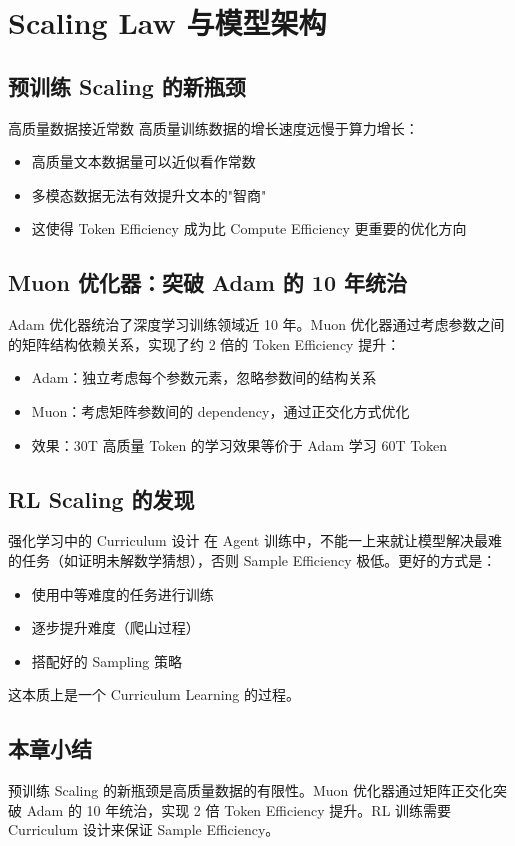 \section{Scaling Law 与模型架构}

\subsection{预训练 Scaling 的新瓶颈}

\begin{warningbox}{高质量数据接近常数}
高质量训练数据的增长速度远慢于算力增长：
\begin{itemize}
    \item 高质量文本数据量可以近似看作常数
    \item 多模态数据无法有效提升文本的"智商"
    \item 这使得 Token Efficiency 成为比 Compute Efficiency 更重要的优化方向
\end{itemize}
\end{warningbox}

\subsection{Muon 优化器：突破 Adam 的 10 年统治}

Adam 优化器统治了深度学习训练领域近 10 年。Muon 优化器通过考虑参数之间的矩阵结构依赖关系，实现了约 2 倍的 Token Efficiency 提升：

\begin{itemize}
    \item Adam：独立考虑每个参数元素，忽略参数间的结构关系
    \item Muon：考虑矩阵参数间的 dependency，通过正交化方式优化
    \item 效果：30T 高质量 Token 的学习效果等价于 Adam 学习 60T Token
\end{itemize}

\subsection{RL Scaling 的发现}

\begin{knowledgebox}{强化学习中的 Curriculum 设计}
在 Agent 训练中，不能一上来就让模型解决最难的任务（如证明未解数学猜想），否则 Sample Efficiency 极低。更好的方式是：
\begin{itemize}
    \item 使用中等难度的任务进行训练
    \item 逐步提升难度（爬山过程）
    \item 搭配好的 Sampling 策略
\end{itemize}
这本质上是一个 Curriculum Learning 的过程。
\end{knowledgebox}

\subsection{本章小结}

预训练 Scaling 的新瓶颈是高质量数据的有限性。Muon 优化器通过矩阵正交化突破 Adam 的 10 年统治，实现 2 倍 Token Efficiency 提升。RL 训练需要 Curriculum 设计来保证 Sample Efficiency。


